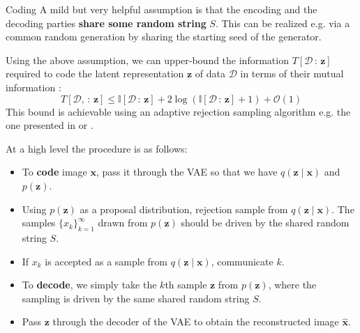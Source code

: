 \documentclass[final]{beamer}
\newlength{\onecolwid}
\newlength{\twocolwid}
\renewcommand{\vec}[1]{\mathbf{#1}}
\newcommand{\D}{\mathcal{D}}
\newcommand{\I}{\mathbb{I}}
\newcommand{\Oh}{\mathcal{O}}
\begin{document}
\begin{frame}[t]
\begin{columns}[t]
\begin{column}{\twocolwid}
\begin{columns}[t,totalwidth=\twocolwid]
\begin{column}{\onecolwid}

  \begin{block}{Coding}
    \noindent
    A mild but very helpful assumption is that the encoding and the
    decoding parties \textbf{share some random string} $S$. This can be realized
    e.g. via a common random generation by sharing the starting seed of the generator. 

    \noindent
    Using the above assumption, we can upper-bound the information $T[\D \,:\,
    \vec{z}]$ required to code the latent representation $\vec{z}$ of data $\D$
    in terms of their mutual information \cite{harsha2007communication}:
    \begin{equation}
      \label{eq:coding_bound}
      T[\D, \,:\, \vec{z}] \leq \I[\D \,:\, \vec{z}] + 2\log(\I[\D \,:\, \vec{z}] + 1) + \Oh(1)
    \end{equation}
    This bound is achievable using an adaptive rejection sampling algorithm e.g.
    the one presented in \cite{harsha2007communication} or \cite{havasi2018minimal}. 

    \noindent At a high level the procedure is as follows:
    \begin{itemize}
      \item To \textbf{code} image $\vec{x}$, pass it through the VAE so that we have
        $q(\vec{z} \mid \vec{x})$ and $p(\vec{z})$.
      \item Using $p(\vec{z})$ as a proposal distribution, rejection sample 
        from $q(\vec{z} \mid \vec{x})$. The samples $\{x_k\}_{k = 1}^{\infty}$
        drawn from $p(\vec{z})$ should be driven by the shared random string $S$.
      \item If $x_k$ is accepted as a sample from $q(\vec{z} \mid \vec{x})$,
        communicate $k$.
      \item To \textbf{decode}, we simply take the $k$th sample $\vec{z}$ from
        $p(\vec{z})$, where the sampling is driven by the same shared random
        string $S$.
      \item Pass $\vec{z}$ through the decoder of the VAE to obtain the
        reconstructed image $\hat{\vec{x}}$.
    \end{itemize}
\end{block}




\end{column}
\end{columns}
\end{column}
\end{columns}
\end{frame}
\end{document}

